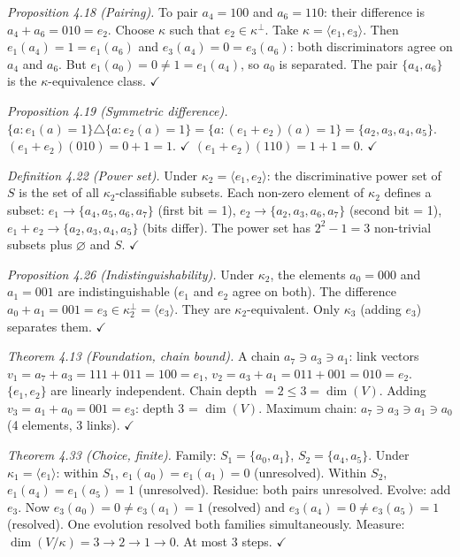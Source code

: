 \emph{Proposition 4.18 (Pairing).}
To pair $a_4 = 100$ and $a_6 = 110$: their difference is
$a_4 + a_6 = 010 = e_2$. Choose $\kappa$ such that
$e_2 \in \kappa^\perp$. Take $\kappa = \langle e_1,
e_3 \rangle$. Then $e_1(a_4) = 1 = e_1(a_6)$ and
$e_3(a_4) = 0 = e_3(a_6)$: both discriminators agree
on $a_4$ and $a_6$. But $e_1(a_0) = 0 \neq 1 =
e_1(a_4)$, so $a_0$ is separated. The pair
$\{a_4, a_6\}$ is the $\kappa$-equivalence class.
$\checkmark$

\emph{Proposition 4.19 (Symmetric difference).}
$\{a : e_1(a) = 1\} \triangle \{a : e_2(a) = 1\}
= \{a : (e_1 + e_2)(a) = 1\} = \{a_2, a_3, a_4, a_5\}$.
$(e_1 + e_2)(010) = 0 + 1 = 1$. $\checkmark$
$(e_1 + e_2)(110) = 1 + 1 = 0$. $\checkmark$

\emph{Definition 4.22 (Power set).}
Under $\kappa_2 = \langle e_1, e_2 \rangle$: the
discriminative power set of $S$ is the set of all
$\kappa_2$-classifiable subsets. Each non-zero element
of $\kappa_2$ defines a subset:
$e_1 \to \{a_4, a_5, a_6, a_7\}$ (first bit = 1),
$e_2 \to \{a_2, a_3, a_6, a_7\}$ (second bit = 1),
$e_1{+}e_2 \to \{a_2, a_3, a_4, a_5\}$ (bits differ).
The power set has $2^2 - 1 = 3$ non-trivial subsets
plus $\varnothing$ and $S$. $\checkmark$

\emph{Proposition 4.26 (Indistinguishability).}
Under $\kappa_2$, the elements $a_0 = 000$ and
$a_1 = 001$ are indistinguishable ($e_1$ and $e_2$
agree on both). The difference $a_0 + a_1 = 001 = e_3
\in \kappa_2^\perp = \langle e_3 \rangle$. They are
$\kappa_2$-equivalent. Only $\kappa_3$ (adding $e_3$)
separates them. $\checkmark$

\emph{Theorem 4.13 (Foundation, chain bound).}
A chain $a_7 \ni a_3 \ni a_1$: link vectors
$v_1 = a_7 + a_3 = 111 + 011 = 100 = e_1$,
$v_2 = a_3 + a_1 = 011 + 001 = 010 = e_2$.
$\{e_1, e_2\}$ are linearly independent. Chain depth
$= 2 \leq 3 = \dim(V)$. Adding $v_3 = a_1 + a_0 =
001 = e_3$: depth 3 = $\dim(V)$. Maximum chain:
$a_7 \ni a_3 \ni a_1 \ni a_0$ (4 elements, 3 links).
$\checkmark$

\emph{Theorem 4.33 (Choice, finite).}
Family: $S_1 = \{a_0, a_1\}$, $S_2 = \{a_4, a_5\}$.
Under $\kappa_1 = \langle e_1 \rangle$: within $S_1$,
$e_1(a_0) = e_1(a_1) = 0$ (unresolved). Within $S_2$,
$e_1(a_4) = e_1(a_5) = 1$ (unresolved).
Residue: both pairs unresolved. Evolve: add $e_3$.
Now $e_3(a_0) = 0 \neq e_3(a_1) = 1$ (resolved) and
$e_3(a_4) = 0 \neq e_3(a_5) = 1$ (resolved). One
evolution resolved both families simultaneously.
Measure: $\dim(V/\kappa) = 3 \to 2 \to 1 \to 0$.
At most 3 steps. $\checkmark$

